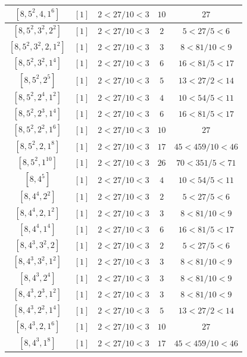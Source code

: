 \documentclass{article}%
\begin{document}
\begin{center}
\begin{longtable}{||c|c|c|c|c||}
$[8, 5^{2}, 4, 1^{6}]$ & $[1]$ & $2 < 27/10 < 3$ & $10$ & $27$ \\ \hline 
$[8, 5^{2}, 3^{2}, 2^{2}]$ & $[1]$ & $2 < 27/10 < 3$ & $2$ & $5 < 27/5 < 6$ \\ \hline 
$[8, 5^{2}, 3^{2}, 2, 1^{2}]$ & $[1]$ & $2 < 27/10 < 3$ & $3$ & $8 < 81/10 < 9$ \\ \hline 
$[8, 5^{2}, 3^{2}, 1^{4}]$ & $[1]$ & $2 < 27/10 < 3$ & $6$ & $16 < 81/5 < 17$ \\ \hline 
$[8, 5^{2}, 2^{5}]$ & $[1]$ & $2 < 27/10 < 3$ & $5$ & $13 < 27/2 < 14$ \\ \hline 
$[8, 5^{2}, 2^{4}, 1^{2}]$ & $[1]$ & $2 < 27/10 < 3$ & $4$ & $10 < 54/5 < 11$ \\ \hline 
$[8, 5^{2}, 2^{3}, 1^{4}]$ & $[1]$ & $2 < 27/10 < 3$ & $6$ & $16 < 81/5 < 17$ \\ \hline 
$[8, 5^{2}, 2^{2}, 1^{6}]$ & $[1]$ & $2 < 27/10 < 3$ & $10$ & $27$ \\ \hline 
$[8, 5^{2}, 2, 1^{8}]$ & $[1]$ & $2 < 27/10 < 3$ & $17$ & $45 < 459/10 < 46$ \\ \hline 
$[8, 5^{2}, 1^{10}]$ & $[1]$ & $2 < 27/10 < 3$ & $26$ & $70 < 351/5 < 71$ \\ \hline 
$[8, 4^{5}]$ & $[1]$ & $2 < 27/10 < 3$ & $4$ & $10 < 54/5 < 11$ \\ \hline 
$[8, 4^{4}, 2^{2}]$ & $[1]$ & $2 < 27/10 < 3$ & $2$ & $5 < 27/5 < 6$ \\ \hline 
$[8, 4^{4}, 2, 1^{2}]$ & $[1]$ & $2 < 27/10 < 3$ & $3$ & $8 < 81/10 < 9$ \\ \hline 
$[8, 4^{4}, 1^{4}]$ & $[1]$ & $2 < 27/10 < 3$ & $6$ & $16 < 81/5 < 17$ \\ \hline 
$[8, 4^{3}, 3^{2}, 2]$ & $[1]$ & $2 < 27/10 < 3$ & $2$ & $5 < 27/5 < 6$ \\ \hline 
$[8, 4^{3}, 3^{2}, 1^{2}]$ & $[1]$ & $2 < 27/10 < 3$ & $3$ & $8 < 81/10 < 9$ \\ \hline 
$[8, 4^{3}, 2^{4}]$ & $[1]$ & $2 < 27/10 < 3$ & $3$ & $8 < 81/10 < 9$ \\ \hline 
$[8, 4^{3}, 2^{3}, 1^{2}]$ & $[1]$ & $2 < 27/10 < 3$ & $3$ & $8 < 81/10 < 9$ \\ \hline 
$[8, 4^{3}, 2^{2}, 1^{4}]$ & $[1]$ & $2 < 27/10 < 3$ & $5$ & $13 < 27/2 < 14$ \\ \hline 
$[8, 4^{3}, 2, 1^{6}]$ & $[1]$ & $2 < 27/10 < 3$ & $10$ & $27$ \\ \hline 
$[8, 4^{3}, 1^{8}]$ & $[1]$ & $2 < 27/10 < 3$ & $17$ & $45 < 459/10 < 46$ \\ \hline 

\end{longtable}
\end{center}
\end{document}
